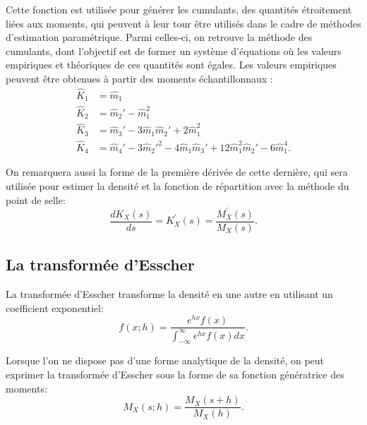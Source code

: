 Cette fonction est utilisée pour générer les cumulants, des quantités
étroitement liées aux moments, qui peuvent à leur tour être utilisés
dans le cadre de méthodes d'estimation paramétrique. Parmi celles-ci,
on retrouve la méthode des cumulants, dont l'objectif est de former un
système d'équations où les valeurs empiriques et théoriques de ces
quantités sont égales. Les valeurs empiriques peuvent être obtenues à
partir des moments échantillonnaux \citep{stuart1987kendall}:
\begin{subequations}\label{eq:cumulantsempiriques}
  \begin{align}
    \hat{K}_1 &= \hat{m}_1 \label{eq:cumulantsempiriques1}\\
    \hat{K}_2 &= \hat{m}_2' - \hat{m}_1^2 \label{eq:cumulantsempiriques2}\\
    \hat{K}_3 &= \hat{m}_3' - 3\hat{m}_1\hat{m}_2' + 2\hat{m}_1^2 \label{eq:cumulantsempiriques3}\\
    \hat{K}_4 &= \hat{m}_4' - 3\hat{m}_2'^2 - 4\hat{m}_1\hat{m}_3' + 12\hat{m}_1^2\hat{m}_2' -
    6\hat{m}_1^4 \label{eq:cumulantsempiriques4}.
  \end{align}
\end{subequations}

On remarquera aussi la forme de la première dérivée de cette dernière,
qui sera utilisée pour estimer la densité et la fonction de
répartition avec la méthode du point de selle:
\begin{equation}
  \label{eq:derivfgc}
  \frac{dK_X(s)}{ds} = K^{\prime}_X(s) = \frac{M^{\prime}_X(s)}{M_X(s)}.
\end{equation}

\subsection{La transformée d'Esscher}
\label{sec:transesscher}

La transformée d'Esscher transforme la densité en une autre en
utilisant un coefficient exponentiel:
\begin{equation}
  \label{eq:esschertransform}
  f(x;h)=\frac{e^{hx}f(x)}{\int_{-\infty}^\infty e^{hx} f(x) dx}.
\end{equation}

Lorsque l'on ne dispose pas d'une forme analytique de la densité, on
peut exprimer la transformée d'Esscher sous la forme de sa fonction
génératrice des moments:
\begin{equation}
  \label{eq:esscherMx}
  M_X(s;h) = \frac{M_X(s+h)}{M_X(h)}.
\end{equation}

